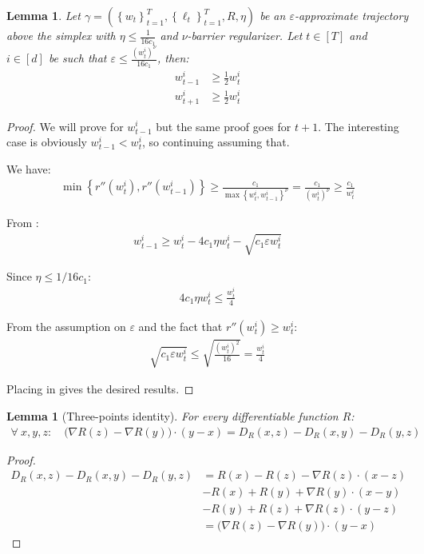 \documentclass[10pt]{article}
\newtheorem{lemma}[theorem]{Lemma}
\theoremstyle{definition}
\theoremstyle{remark}
\renewcommand{\epsilon}{\varepsilon}
\newcommand{\curly}[1]{ {\left\{ #1 \right\}}}
\newcommand{\barconst}{\nu}
\begin{document}
\begin{lemma}\label{lem:not_too_far}
Let $\gamma = (\curly{w_t}_{t=1}^T, \curly{\ell_t}_{t=1}^T, R, \eta)$ be an $\epsilon$-approximate trajectory above the simplex with $\eta \le \frac{1}{16c_1}$ and $\barconst$-barrier regularizer. Let $t\in[T]$ and $i\in[d]$ be such that $\epsilon \le \frac{(w_t^i)^\barconst}{16c_1}$, then:
\begin{align*}
    w_{t-1}^i &\ge \frac{1}{2}w_t^i\\
    w_{t+1}^i &\ge \frac{1}{2}w_t^i
\end{align*}
\end{lemma}
\begin{proof}
We will prove for $w_{t-1}^i$ but the same proof goes for $t+1$. The interesting case is obviously $w_{t-1}^i < w_t^i$, so continuing assuming that.

We have:
\begin{align*}
    \min\curly{r''(w_t^i), r''(w_{t-1}^i)} \ge \frac{c_1}{\max\curly{w_t^i, w_{t-1}^i}^\barconst} = \frac{c_1}{(w_t^i)^\barconst} \ge \frac{c_1}{w_t^i}
\end{align*}

From :
\begin{align}\label{eq:single_step_relation}
    w_{t-1}^i \ge w_t^i - 4c_1\eta w_t^i - \sqrt{c_1\epsilon w_t^i}
\end{align}

Since $\eta \le 1/16c_1$:
\begin{align}\label{eq:first_term}
    4c_1\eta w_t^i \le \frac{w_t^i}{4}
\end{align}

From the assumption on $\epsilon$ and the fact that $r''(w_t^i) \ge w_t^i$:
\begin{align}\label{eq:sec_term}
    \sqrt{c_1\epsilon w_t^i} \le \sqrt{\frac{(w_t^i)^2}{16}} = \frac{w_t^i}{4}
\end{align}

Placing  in  gives the desired results.
\end{proof}

\begin{lemma}[Three-points identity]\label{lem:three_points}
For every differentiable function $R$:
\begin{align*}
\forall ~x,y,z: \quad
\big (\nabla R(z)-\nabla R(y) \big) \cdot (y-x)
=
D_R(x,z) - D_R(x,y) - D_R(y,z)
\end{align*}
\end{lemma}
\begin{proof}
\begin{align*}
D_R(x,z) - D_R(x,y) - D_R(y,z)
&=
R(x) - R(z) - \nabla R(z) \cdot (x-z)
\\
&- R(x) + R(y) + \nabla R(y) \cdot (x-y)
\\
&- R(y) + R(z) + \nabla R(z) \cdot (y-z)
\\
&=
\big (\nabla R(z)-\nabla R(y) \big) \cdot (y-x)
\end{align*}
\end{proof}
\end{document}
